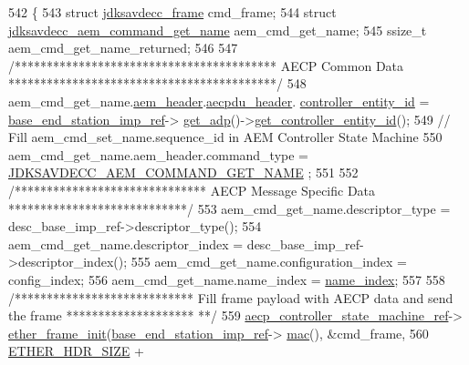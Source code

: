 \begin{DoxyCode}
542 \{
543     \textcolor{keyword}{struct }\hyperlink{structjdksavdecc__frame}{jdksavdecc\_frame} cmd\_frame;
544     \textcolor{keyword}{struct }\hyperlink{structjdksavdecc__aem__command__get__name}{jdksavdecc\_aem\_command\_get\_name} aem\_cmd\_get\_name;
545     ssize\_t aem\_cmd\_get\_name\_returned;
546 
547     \textcolor{comment}{/***************************************** AECP Common Data ******************************************/}
548     aem\_cmd\_get\_name.\hyperlink{structjdksavdecc__aem__command__get__name_ae1e77ccb75ff5021ad923221eab38294}{aem\_header}.\hyperlink{structjdksavdecc__aecpdu__aem_ae8460ae179666e7ce268ed1ef33d0de3}{aecpdu\_header}.
      \hyperlink{structjdksavdecc__aecpdu__common_affc928ddb4fc62d1d04a775d36e5f2c8}{controller\_entity\_id} = \hyperlink{classavdecc__lib_1_1descriptor__base__imp_a550c969411f5f3b69f55cc139763d224}{base\_end\_station\_imp\_ref}->
      \hyperlink{classavdecc__lib_1_1end__station__imp_a471a74540ce6182fad0c17dfd010107e}{get\_adp}()->\hyperlink{classavdecc__lib_1_1adp_a0c0959a46658c0a22e9530334b2912da}{get\_controller\_entity\_id}();
549     \textcolor{comment}{// Fill aem\_cmd\_set\_name.sequence\_id in AEM Controller State Machine}
550     aem\_cmd\_get\_name.aem\_header.command\_type = \hyperlink{group__command_gab5a8244c35a72f9d4dcded988c51d8e3}{JDKSAVDECC\_AEM\_COMMAND\_GET\_NAME}
      ;
551 
552     \textcolor{comment}{/****************************** AECP Message Specific Data ****************************/}
553     aem\_cmd\_get\_name.descriptor\_type = desc\_base\_imp\_ref->descriptor\_type();
554     aem\_cmd\_get\_name.descriptor\_index = desc\_base\_imp\_ref->descriptor\_index();
555     aem\_cmd\_get\_name.configuration\_index = config\_index;
556     aem\_cmd\_get\_name.name\_index = \hyperlink{structjdksavdecc__aem__command__get__name_a898a74ada625e0b227dadb02901404e6}{name\_index};
557 
558     \textcolor{comment}{/**************************** Fill frame payload with AECP data and send the frame ********************
      **/}
559     \hyperlink{namespaceavdecc__lib_a0b1b5aea3c0490f77cbfd9178af5be22}{aecp\_controller\_state\_machine\_ref}->
      \hyperlink{classavdecc__lib_1_1aecp__controller__state__machine_a86ff947c5e6b799cfb877d3767bfa1f9}{ether\_frame\_init}(\hyperlink{classavdecc__lib_1_1descriptor__base__imp_a550c969411f5f3b69f55cc139763d224}{base\_end\_station\_imp\_ref}->
      \hyperlink{classavdecc__lib_1_1end__station__imp_a08e1bd1861b3b8f447ea374a65ac11f9}{mac}(), &cmd\_frame,
560                                                         \hyperlink{namespaceavdecc__lib_a6c827b1a0d973e18119c5e3da518e65ca9512ad9b34302ba7048d88197e0a2dc0}{ETHER\_HDR\_SIZE} + 

\end{DoxyCode}
